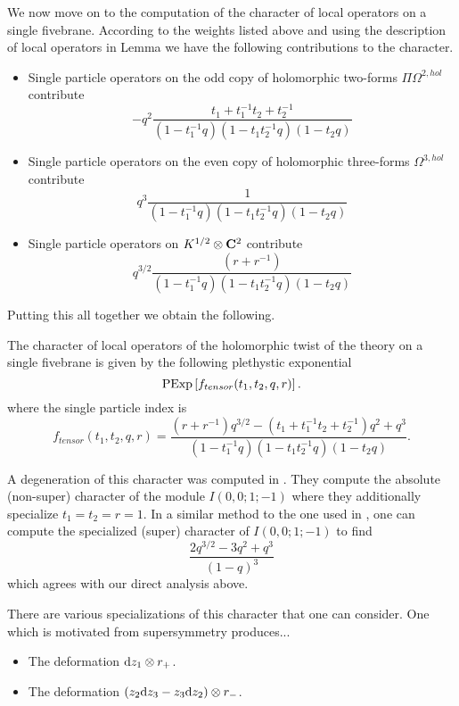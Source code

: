 \parsec

We now move on to the computation of the character of local operators on a single fivebrane.
According to the weights listed above and using the description of local operators in Lemma \label{lem:single} we have the following contributions to the character.

\begin{itemize}
\item Single particle operators on the odd copy of holomorphic two-forms $\Pi \Omega^{2,hol}$ contribute
\[
- q^2 \frac{t_1  + t_1^{-1} t_2  + t_2^{-1} }{(1-t_1^{-1}q) (1-t_1 t_2^{-1} q) (1-t_2 q)} 
\]
\item Single particle operators on the even copy of holomorphic three-forms $\Omega^{3,hol}$ contribute
\[
q^3 \frac{1}{(1-t_1^{-1}q) (1-t_1 t_2^{-1} q) (1-t_2 q)} 
\]
\item Single particle operators on $K^{1/2} \otimes \mathbf{C}^2$ contribute
\[
q^{3/2}\frac{(r + r^{-1})}{(1-t_1^{-1}q) (1-t_1 t_2^{-1} q) (1-t_2 q)}
\]
\end{itemize}

Putting this all together we obtain the following.

\begin{prop}
The character of local operators of the holomorphic twist of the theory on a single fivebrane is given by the following plethystic exponential
\[
{\rm PExp} \left[f_{tensor} (t_1,t_2,q,r) \right] .
\]
where the single particle index is
\[
f_{tensor} (t_1,t_2,q,r) = \frac{(r + r^{-1})q^{3/2} - (t_1 + t_1^{-1} t_2 + t_2^{-1} )q^2 + q^3}{(1-t_1^{-1}q) (1-t_1 t_2^{-1} q) (1-t_2 q)} .
\]
\end{prop}

\parsec

A degeneration of this character was computed in \cite{KR1}. 
They compute the absolute (non-super) character of the module $I(0,0;1;-1)$ where they additionally specialize $t_1=t_2=r=1$. 
In a similar method to the one used in \cite{KR1}, one can compute the specialized (super) character of $I(0,0;1;-1)$ to find
\[
\frac{2 q^{3/2} - 3 q^2 + q^3}{(1-q)^3}
\]
which agrees with our direct analysis above.

\parsec

There are various specializations of this character that one can consider. 
One which is motivated from supersymmetry produces...

\begin{itemize}
\item The deformation ${\rm d} z_1 \otimes r_+$.
\item The deformation $(z_2 {\rm d} z_3 - z_3 {\rm d} z_2) \otimes r_-$. 
\end{itemize}

